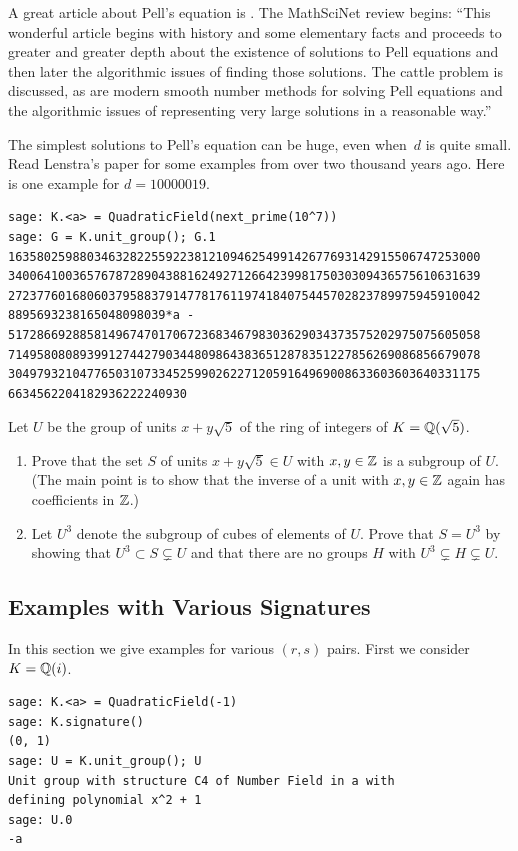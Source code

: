 A great article about Pell's equation is \cite{lenstra:pell}.  The
MathSciNet review begins: ``This wonderful article begins with history
and some elementary facts and proceeds to greater and greater depth
about the existence of solutions to Pell equations and then later the
algorithmic issues of finding those solutions. The cattle problem is
discussed, as are modern smooth number methods for solving Pell
equations and the algorithmic issues of representing very large
solutions in a reasonable way.''

The simplest solutions to Pell's equation can be huge, even when~$d$
is quite small.  Read Lenstra's paper for some examples from
over two thousand years ago.  Here is one example for $d=10000019$.

\begin{lstlisting}
sage: K.<a> = QuadraticField(next_prime(10^7))
sage: G = K.unit_group(); G.1
163580259880346328225592238121094625499142677693142915506747253000
340064100365767872890438816249271266423998175030309436575610631639
272377601680603795883791477817611974184075445702823789975945910042
8895693238165048098039*a - 
517286692885814967470170672368346798303629034373575202975075605058
714958080893991274427903448098643836512878351227856269086856679078
304979321047765031073345259902622712059164969008633603603640331175
6634562204182936222240930
\end{lstlisting}

\begin{exercise}
  Let $U$ be the group of units $x+y\sqrt{5}$ of the ring of integers
  of $K=\mathbb{Q}(\sqrt{5})$.  
\begin{enumerate}
\item Prove that the set $S$ of units $x+y\sqrt{5} \in U$ with
  $x,y\in\mathbb{Z}$ is a subgroup of $U$.  (The main point is to show that
  the inverse of a unit with $x,y\in\mathbb{Z}$ again has coefficients in
  $\mathbb{Z}$.)
\item Let $U^3$ denote the subgroup of cubes of elements of $U$.
  Prove that $S=U^3$ by showing that $U^3\subset S \subsetneq U$ and
  that there are no groups $H$ with $U^3\subsetneq H \subsetneq U$.
\end{enumerate}
\end{exercise}

\subsection{Examples with Various Signatures}
In this section we give examples for various $(r,s)$ pairs. 
First we consider $K=\mathbb{Q}(i)$.
\begin{lstlisting}
sage: K.<a> = QuadraticField(-1)
sage: K.signature()
(0, 1)
sage: U = K.unit_group(); U
Unit group with structure C4 of Number Field in a with 
defining polynomial x^2 + 1
sage: U.0
-a
\end{lstlisting}

